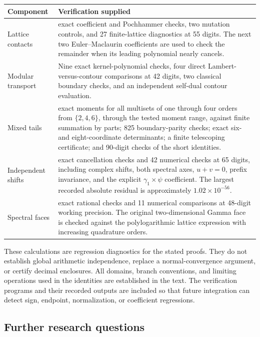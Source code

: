 \begin{longtable}{@{}>{\raggedright\arraybackslash}p{}>{\raggedright\arraybackslash}p{}@{}}
\toprule
\textbf{Component} & \textbf{Verification supplied}\\
\midrule
\endhead
Lattice contacts
&
60 exact coefficient and Pochhammer checks, two mutation
controls, and 27 finite-lattice diagnostics at 55 digits.
The next two Euler--Maclaurin coefficients are used to check
the remainder when its leading polynomial nearly cancels.\\[4pt]
Modular transport
&
Nine exact kernel-polynomial checks, four direct
Lambert-versus-contour comparisons at 42 digits,
two classical boundary checks, and an independent
self-dual contour evaluation.\\[4pt]
Mixed tails
&
306 exact moments for all multisets of one through four
orders from \(\{2,4,6\}\), through the tested moment range,
against finite summation by parts; 825 boundary-parity
checks; exact six- and eight-coordinate determinants;
a finite telescoping certificate; and 90-digit checks
of the short identities.\\[4pt]
Independent shifts
&
16 exact cancellation checks and 42 numerical checks
at 65 digits, including complex shifts, both spectral
axes, \(u+v=0\), prefix invariance, and the explicit
\(\gamma_1\times\psi\) coefficient.
The largest recorded absolute residual is approximately
\(1.02\times10^{-56}\).\\[4pt]
Spectral faces
&
34 exact rational checks and 11 numerical comparisons
at 48-digit working precision. The original
two-dimensional Gamma face is checked against the
polylogarithmic lattice expression with increasing
quadrature orders.\\
\bottomrule
\end{longtable}

These calculations are regression diagnostics for the stated
proofs. They do not establish global arithmetic independence,
replace a normal-convergence argument, or certify decimal
enclosures. All domains, branch conventions, and limiting
operations used in the identities are established in the text.
The verification programs and their recorded outputs are
included so that future integration can detect sign, endpoint,
normalization, or coefficient regressions.

\subsection{Further research questions}
\label{sec:questions}


